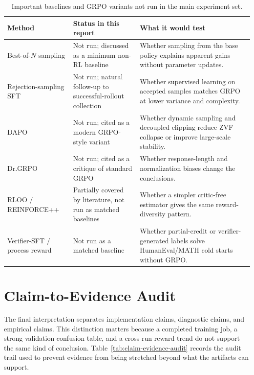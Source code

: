 \documentclass[12pt,a4paper]{report}
\begin{document}
\begin{table}[ht]
\centering
\caption{Important baselines and GRPO variants not run in the main experiment set.}
\label{tab:missing-modern-baselines}
\small
\footnotesize
\begin{tabularx}{\textwidth}{p{3.0cm}p{3.6cm}X}
\toprule
Method & Status in this report & What it would test\\
\midrule
Best-of-$N$ sampling & Not run; discussed as a minimum non-RL baseline & Whether sampling from the base policy explains apparent gains without parameter updates.\\
Rejection-sampling SFT & Not run; natural follow-up to successful-rollout collection & Whether supervised learning on accepted samples matches GRPO at lower variance and complexity.\\
DAPO & Not run; cited as a modern GRPO-style variant~\citep{yu2025dapo} & Whether dynamic sampling and decoupled clipping reduce ZVF collapse or improve large-scale stability.\\
Dr.GRPO & Not run; cited as a critique of standard GRPO~\citep{liu2025r1zerocritical} & Whether response-length and normalization biases change the conclusions.\\
RLOO / REINFORCE++ & Partially covered by literature, not run as matched baselines~\citep{ahmadian2024backtobasics,hu2025reinforceplusplus} & Whether a simpler critic-free estimator gives the same reward-diversity pattern.\\
Verifier-SFT / process reward & Not run as a matched baseline & Whether partial-credit or verifier-generated labels solve HumanEval/MATH cold starts without GRPO.\\
\bottomrule
\end{tabularx}
\end{table}

\section{Claim-to-Evidence Audit}
\label{sec:claim-evidence-audit}

The final interpretation separates implementation claims, diagnostic claims, and empirical claims. This distinction matters because a completed training job, a strong validation confusion table, and a cross-run reward trend do not support the same kind of conclusion. Table~\ref{tab:claim-evidence-audit} records the audit trail used to prevent evidence from being stretched beyond what the artifacts can support.
\end{document}

